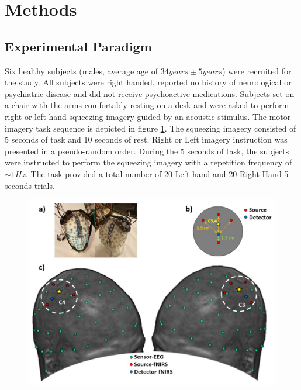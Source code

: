 \documentclass[12pt ]{iopart}
\begin{document}
\section{Methods}
\subsection{Experimental Paradigm}
Six healthy subjects (males, average age of $34 years\pm 5 years$) were recruited for the study. All subjects were right handed, reported no history of neurological or psychiatric disease and did not receive psychoactive medications. 
Subjects set on a chair with the arms comfortably resting on a desk and were asked to perform right or left hand squeezing imagery guided by an acoustic stimulus. The motor imagery task sequence is depicted in figure \ref{fig:fig2}. The 
squeezing imagery consisted of 5 seconds of task and 10 seconds of rest. Right or Left imagery instruction was presented in a pseudo-random order.  During the 5 seconds of task, the subjects were instructed to perform the squeezing imagery with a repetition frequency of $\sim1Hz$. The task provided a total number of 20 Left-hand and 20 Right-Hand 5 seconds trials. 

\begin{figure}
	\includegraphics[width=\linewidth]{Slide2.JPG}
	\caption{}
	\label{fig:fig2}
\end{figure}
\end{document}
